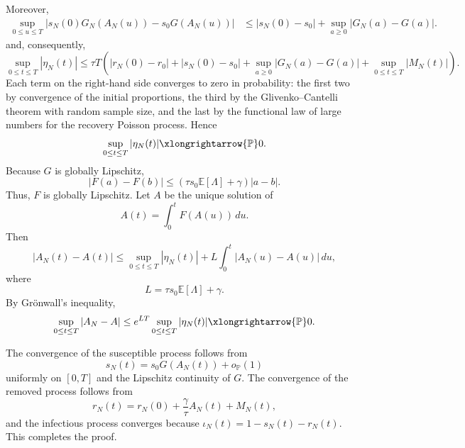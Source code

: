 \documentclass[pdflatex,sn-mathphys-ay]{sn-jnl}
\theoremstyle{thmstyleone}
\theoremstyle{thmstyletwo}
\theoremstyle{thmstylethree}
\newcommand{\E}{\mathbb{E}}
\newcommand{\Pp}{\mathbb{P}}
\begin{document}
Moreover,
\[
\begin{aligned}
\sup_{0\le u\le T}
\left|
s_N(0)G_N(A_N(u))
-
s_0G(A_N(u))
\right|
&\le
|s_N(0)-s_0|
+
\sup_{a\ge0}|G_N(a)-G(a)|.
\end{aligned}
\]
and, consequently, 
\[
\sup_{0\le t\le T}|\eta_N(t)| 
\le
\tau T
\left(
|r_N(0)-r_0|
+
|s_N(0)-s_0|
+
\sup_{a\ge0}|G_N(a)-G(a)|
+
\sup_{0\leq t\leq T}|M_N(t)|
\right).
\]
Each term on the right-hand side converges to zero in probability:
the first two by convergence of the initial proportions, the third by the
Glivenko--Cantelli theorem with random sample size, and the last by the
functional law of large numbers for the recovery Poisson process. Hence
\[
\sup_{0\leq t\leq T}|\eta_N(t)|
\xlongrightarrow{\Pp}0.
\]
Because \(G\) is globally Lipschitz,
\[
|F(a)-F(b)|
\leq
\left(\tau s_0\E[\Lambda]+\gamma\right)|a-b|.
\]
Thus, \(F\) is globally Lipschitz. Let \(A\) be the unique solution of
\[
A(t)=\int_0^tF(A(u))\,du.
\]
Then
\[
|A_N(t)-A(t)|
\leq
\sup_{0\leq t\leq T}|\eta_N(t)|
+
L\int_0^t|A_N(u)-A(u)|\,du,
\]
where
\[
L=\tau s_0\E[\Lambda]+\gamma.
\]
By Gr\"onwall's inequality,
\[
\sup_{0\leq t\leq T}|A_N-A|
\leq
e^{LT}\sup_{0\leq t\leq T}|\eta_N(t)|
\xlongrightarrow{\Pp}0.
\]

The convergence of the susceptible process follows from
\[
s_N(t)=s_0G(A_N(t))+o_{\Pp}(1)
\]
uniformly on \([0,T]\) and the Lipschitz continuity of \(G\). The convergence of
the removed process follows from
\[
r_N(t)
=
r_N(0)+\frac{\gamma}{\tau}A_N(t)+M_N(t),
\]
and the infectious process converges because
\(
\iota_N(t)=1-s_N(t)-r_N(t).
\)
This completes the proof.
\end{document}
